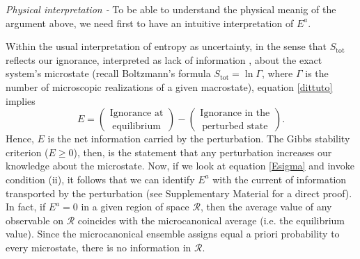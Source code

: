 \documentclass[aps,prl,reprint,nofootinbib]{revtex4-1}
\begin{document}
\textit{Physical interpretation -} To be able to understand the physical meanig of the argument above, we need first to have an intuitive interpretation of $E^a$. 

Within the usual interpretation of entropy as uncertainty, in the sense that $S_{\text{tot}}$ reflects our ignorance, interpreted as lack of information \cite{JaynesInformation1957}, about the exact system's microstate (recall Boltzmann's formula $S_{\text{tot}}=\ln \Gamma$, where $\Gamma$ is the number of microscopic realizations of a given macrostate), equation \eqref{dittuto} implies
\begin{equation}
E =  \binom{\text{ Ignorance at }}{\text{ equilibrium }} - \binom{\text{ Ignorance in the }}{\text{ perturbed state }} .
\end{equation}
Hence, $E$ is the net information carried by the perturbation. The Gibbs stability criterion ($E \geq 0$), then, is the statement that any perturbation increases our knowledge about the microstate. 
Now, if we look at equation \eqref{Esigma} and invoke condition (ii), it follows that we can identify $E^a$ with the current of information 
transported by the perturbation (see Supplementary Material for a direct proof). In fact, if $E^a=0$ in a given region of space $\mathcal{R}$, then the average value of any observable on $\mathcal{R}$ coincides with the microcanonical average (i.e. the equilibrium value). Since the microcanonical ensemble assigns equal a priori probability to every microstate, there is no information in $\mathcal{R}$. 
\end{document}
